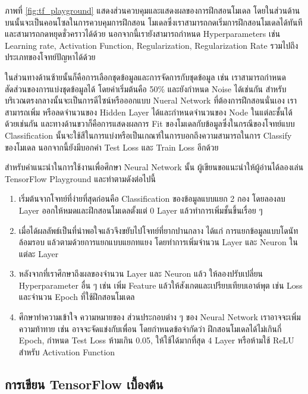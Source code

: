 ภาพที่ \ref{fig:tf_playground} แสดงส่วนควบคุมและแสดงผลของการฝึกสอนโมเดล โดยในส่วนด้านบนนั้นจะเป็นคอนโซลในการควบคุมการฝึกสอน%
โมเดลซึ่งเราสามารถกดเริ่มการฝึกสอนโมเดลได้ทันที และสามารถกดหยุดชั่วคราวได้ด้วย นอกจากนี้เรายังสามารถกำหนด Hyperparameters เช่น 
Learning rate, Activation Function, Regularization, Regularization Rate รวมไปถึงประเภทของโจทย์ปัญหาได้ด้วย

ในส่วนทางด้านซ้ายนั้นก็คือการเลือกชุดข้อมูลและการจัดการกับชุดข้อมูล เช่น เราสามารถกำหนดสัดส่วนของการแบ่งชุดข้อมูลได้ โดยค่าเริ่มต้นคือ 50\%
และยังกำหนด Noise ได้เช่นกัน สำหรับบริเวณตรงกลางนั้นจะเป็นการดีไซน์หรือออกแบบ Nueral Network ที่ต้องการฝึกสอนนั่นเอง เราสามารถเพิ่ม%
หรือลดจำนวนของ Hidden Layer ได้และกำหนดจำนวนของ Node ในแต่ละชั้นได้ด้วยเช่นกัน และทางด้านขวาก็คือการแสดงผลการ Fit 
ของโมเดลกับข้อมูลซึ่งในกรณีของโจทย์แบบ Classification นั้นจะใช้สีในการแบ่งหรือเป็นเกณฑ์ในการบอกถึงความสามารถในการ Classify ของโมเดล
นอกจากนี้ยังมีบอกค่า Test Loss และ Train Loss อีกด้วย

สำหรับคำแนะนำในการใช้งานเพื่อศึกษา Neural Network นั้น ผู้เขียนขอแนะนำให้ผู้อ่านได้ลองเล่น TensorFlow Playground และทำตามดังต่อไปนี้

\begin{enumerate}
    \item เริ่มต้นจากโจทย์ที่ง่ายที่สุดก่อนคือ Classification ของข้อมูลแบบแยก 2 กอง โดยลองลบ Layer ออกให้หมดและฝึกสอนโมเดลตั้งแต่ 
    0 Layer แล้วทำการเพิ่มชั้นขึ้นเรื่อย ๆ 
    
    \item เมื่อได้ผลลัพธ์เป็นที่น่าพอใจแล้วจึงขยับไปโจทย์ที่ยากปานกลาง ได้แก่ การแยกข้อมูลแบบโดนัทล้อมรอบ แล้วตามด้วยการแยกแบบแยกทแยง 
    โดยทำการเพิ่มจำนวน Layer และ Neuron ในแต่ละ Layer 
    
    \item หลังจากที่เราศึกษาถึงผลของจำนวน Layer และ Neuron แล้ว ให้ลองปรับเปลี่ยน Hyperparameter อื่น ๆ เช่น เพิ่ม Feature 
    แล้วให้สังเกตและเปรียบเทียบเอาต์พุต เช่น Loss และจำนวน Epoch ที่ใช้ฝึกสอนโมเดล
    
    \item ศึกษาทำความเข้าใจ ความหมายของ ส่วนประกอบต่าง ๆ ของ Neural Network เราอาจจะเพิ่มความท้าทาย เช่น อาจจะจัดแข่งกับเพื่อน%
    โดยกำหนดข้อจำกัดว่า ฝึกสอนโมเดลได้ไม่เกินกี่ Epoch, กำหนด Test Loss ห้ามเกิน 0.05, ให้ใช้ได้มากที่สุด 4 Layer หรือห้ามใช้ ReLU 
    สำหรับ Activation Function
\end{enumerate}

\subsection{การเขียน TensorFlow เบื้องต้น}


